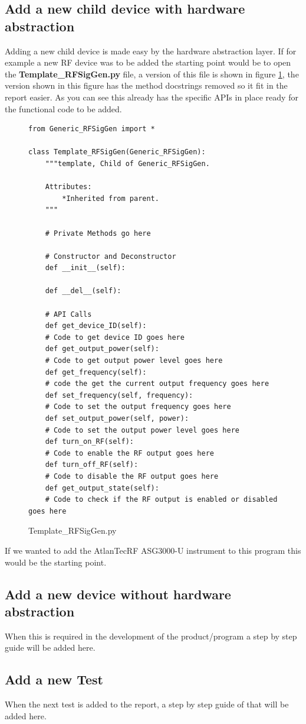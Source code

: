 \documentclass[a4paper, 11pt]{article}
\begin{document}
\subsection{Add a new child device with hardware abstraction}
Adding a new child device is made easy by the hardware abstraction layer. If for example a new RF device was to be added the starting point would be to open the \textbf{Template\_RFSigGen.py} file, a version of this file is shown in figure \ref{fig:TemplateRF.py}, the version shown in this figure has the method docstrings removed so it fit in the report easier. As you can see this already has the specific APIs in place ready for the functional code to be added. 

\begin{figure}[H]
\begin{verbatim}
from Generic_RFSigGen import *

class Template_RFSigGen(Generic_RFSigGen):
    """template, Child of Generic_RFSigGen.

    Attributes:  
        *Inherited from parent.
    """

    # Private Methods go here

    # Constructor and Deconstructor
    def __init__(self):

    def __del__(self):

    # API Calls
    def get_device_ID(self):
	# Code to get device ID goes here
    def get_output_power(self):
	# Code to get output power level goes here
    def get_frequency(self):
    # code the get the current output frequency goes here
    def set_frequency(self, frequency):
	# Code to set the output frequency goes here
    def set_output_power(self, power):
	# Code to set the output power level goes here
    def turn_on_RF(self):
	# Code to enable the RF output goes here
    def turn_off_RF(self):
	# Code to disable the RF output goes here
    def get_output_state(self):
	# Code to check if the RF output is enabled or disabled goes here 
\end{verbatim}
\caption{Template\_RFSigGen.py}
\label{fig:TemplateRF.py}
\end{figure}

If we wanted to add the AtlanTecRF ASG3000-U instrument to this program this would be the starting point. 
\subsection{Add a new device without hardware abstraction}
When this is required in the development of the product/program a step by step guide will be added here. 
\subsection{Add a new Test}
When the next test is added to the report, a step by step guide of that will be added here. 
\end{document}
